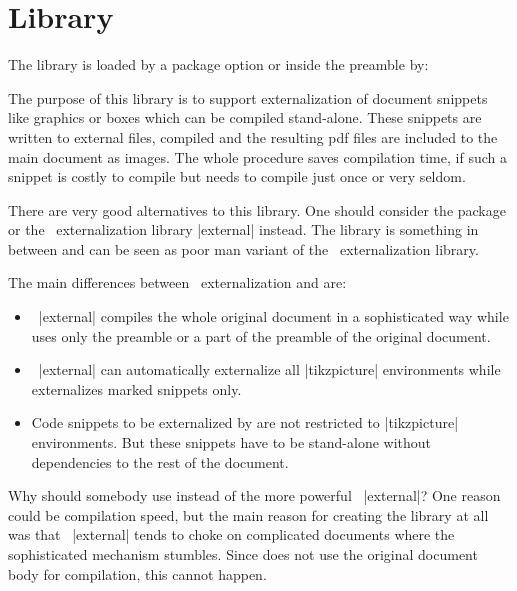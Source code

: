 \clearpage
\section{Library }\label{sec:external}%
%
The library is loaded by a package option or inside the preamble by:
\begin{dispListing}
\end{dispListing}

The purpose of this library is to support externalization of document
snippets like graphics or boxes which can be compiled stand-alone.
These snippets are written to external files, compiled and the resulting
pdf files are included to the main document as images.
The whole procedure saves compilation time, if such a snippet is costly to
compile but needs to compile just once or very seldom.

There are very good alternatives to this library. One should consider
the  package or the \tikzname\ externalization library
|external| instead.
The  library is something in between and can be seen as
poor man variant of the \tikzname\ externalization library.

The main differences between \tikzname\ externalization and  are:
\begin{itemize}
\item\tikzname\ |external| compiles the whole original document in a sophisticated
  way while  uses only the preamble or a part of the preamble
  of the original document.
\item\tikzname\ |external| can automatically externalize all |tikzpicture|
  environments while  externalizes marked snippets only.
\item Code snippets to be externalized by  are not restricted to
  |tikzpicture| environments. But these snippets have to be stand-alone without
  dependencies to the rest of the document.
\end{itemize}
Why should somebody use  instead of the more powerful \tikzname\ |external|?
One reason could be compilation speed, but the main reason for creating the
library at all was that \tikzname\ |external| tends to choke on complicated
documents where the sophisticated mechanism stumbles. Since  does
not use the original document body for compilation, this cannot happen.

